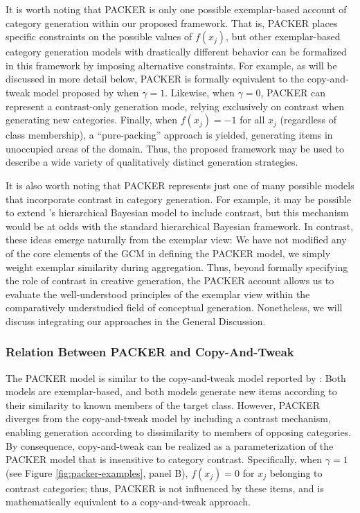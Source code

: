 \documentclass[12pt]{article}
\begin{document}
\begin{flushleft}
It is worth noting that PACKER is only one possible exemplar-based account of category generation within our proposed framework. That is, PACKER places specific constraints on the possible values of $f(x_j)$, but other exemplar-based category generation models with drastically different behavior can be formalized in this framework by imposing alternative constraints. For example, as will be discussed in more detail below, PACKER is formally equivalent to the copy-and-tweak model proposed by \cite{jern2013probabilistic} when $\gamma = 1$. Likewise, when $\gamma = 0$, PACKER can represent a contrast-only generation mode, relying exclusively on contrast when generating new categories. Finally, when $f(x_j) = -1$ for all $x_j$ (regardless of class membership), a ``pure-packing'' approach is yielded, generating items in unoccupied areas of the domain. Thus, the proposed framework may be used to describe a wide variety of qualitatively distinct generation strategies.

It is also worth noting that PACKER represents just one of many possible models that incorporate contrast in category generation. For example, it may be possible to extend \cite{jern2013probabilistic}'s hierarchical Bayesian model to include contrast, but this mechanism would be at odds with the standard hierarchical Bayesian framework. In contrast, these ideas emerge naturally from the exemplar view: We have not modified any of the core elements of the GCM in defining the PACKER model, we simply weight exemplar similarity during aggregation. Thus, beyond formally specifying the role of contrast in creative generation, the PACKER account allows us to evaluate the well-understood principles of the exemplar view within the comparatively understudied field of conceptual generation. Nonetheless, we will discuss integrating our approaches in the General Discussion.

\subsubsection{Relation Between PACKER and Copy-And-Tweak}
\label{section:copytweak-packer}
The PACKER model is similar to the copy-and-tweak model reported by \cite{jern2013probabilistic}: Both models are exemplar-based, and both models generate new items according to their similarity to known members of the target class. However, PACKER diverges from the copy-and-tweak model by including a contrast mechanism, enabling generation according to dissimilarity to members of opposing categories. By consequence, copy-and-tweak can be realized as a parameterization of the PACKER model that is insensitive to category contrast. Specifically, when $\gamma = 1$ (see Figure \ref{fig:packer-examples}, panel B), $f(x_j) = 0$ for $x_j$ belonging to contrast categories; thus, PACKER is not influenced by these items, and is mathematically equivalent to a copy-and-tweak approach. 


\end{flushleft}
\end{document}
